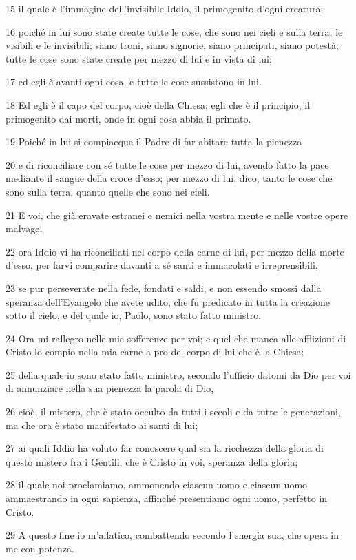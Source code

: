 \par 15 il quale è l'immagine dell'invisibile Iddio, il primogenito d'ogni creatura;
\par 16 poiché in lui sono state create tutte le cose, che sono nei cieli e sulla terra; le visibili e le invisibili; siano troni, siano signorie, siano principati, siano potestà; tutte le cose sono state create per mezzo di lui e in vista di lui;
\par 17 ed egli è avanti ogni cosa, e tutte le cose sussistono in lui.
\par 18 Ed egli è il capo del corpo, cioè della Chiesa; egli che è il principio, il primogenito dai morti, onde in ogni cosa abbia il primato.
\par 19 Poiché in lui si compiacque il Padre di far abitare tutta la pienezza
\par 20 e di riconciliare con sé tutte le cose per mezzo di lui, avendo fatto la pace mediante il sangue della croce d'esso; per mezzo di lui, dico, tanto le cose che sono sulla terra, quanto quelle che sono nei cieli.
\par 21 E voi, che già eravate estranei e nemici nella vostra mente e nelle vostre opere malvage,
\par 22 ora Iddio vi ha riconciliati nel corpo della carne di lui, per mezzo della morte d'esso, per farvi comparire davanti a sé santi e immacolati e irreprensibili,
\par 23 se pur perseverate nella fede, fondati e saldi, e non essendo smossi dalla speranza dell'Evangelo che avete udito, che fu predicato in tutta la creazione sotto il cielo, e del quale io, Paolo, sono stato fatto ministro.
\par 24 Ora mi rallegro nelle mie sofferenze per voi; e quel che manca alle afflizioni di Cristo lo compio nella mia carne a pro del corpo di lui che è la Chiesa;
\par 25 della quale io sono stato fatto ministro, secondo l'ufficio datomi da Dio per voi di annunziare nella sua pienezza la parola di Dio,
\par 26 cioè, il mistero, che è stato occulto da tutti i secoli e da tutte le generazioni, ma che ora è stato manifestato ai santi di lui;
\par 27 ai quali Iddio ha voluto far conoscere qual sia la ricchezza della gloria di questo mistero fra i Gentili, che è Cristo in voi, speranza della gloria;
\par 28 il quale noi proclamiamo, ammonendo ciascun uomo e ciascun uomo ammaestrando in ogni sapienza, affinché presentiamo ogni uomo, perfetto in Cristo.
\par 29 A questo fine io m'affatico, combattendo secondo l'energia sua, che opera in me con potenza.

